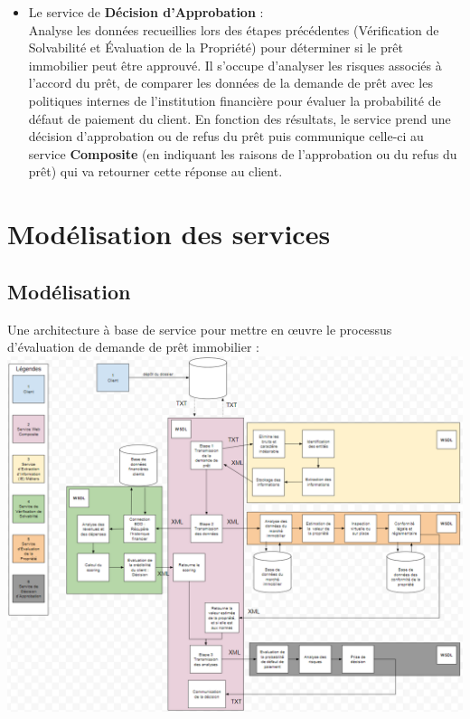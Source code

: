 \documentclass{article}
\begin{document}
\begin{itemize}
			\item Le service de \textbf{Décision d'Approbation} : \\
			
			Analyse les données recueillies lors des étapes précédentes (Vérification de Solvabilité et Évaluation de la Propriété) pour déterminer si le prêt immobilier peut être approuvé. Il s’occupe d’analyser les risques associés à l'accord du prêt, de comparer les données de la demande de prêt avec les politiques internes de l'institution financière pour évaluer la probabilité de défaut de paiement du client. En fonction des résultats, le service prend une décision d'approbation ou de refus du prêt puis communique celle-ci au service \textbf{Composite} (en indiquant les raisons de l'approbation ou du refus du prêt) qui va retourner cette réponse au client.
			
		\end{itemize}
	
	\newpage
	\section{Modélisation des services}
	\subsection{Modélisation}
	Une architecture à base de service pour mettre en œuvre le processus d’évaluation de demande de prêt immobilier :
	\\
	\includegraphics[width=\textwidth]{images/modelisation_XML.png}
	
\end{document}
